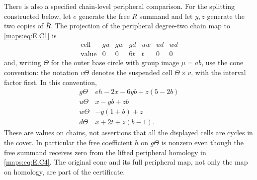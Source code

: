 \begin{theorem}
There is also a specified chain-level peripheral comparison.
For the splitting constructed below, let $e$ generate the
free $R$ summand and let $y,z$ generate the two copies of
$\overline R$. The projection of the peripheral degree-two
chain map to \eqref{maps:eq:E.C1} is
\[
 \begin{array}{c|rrrrrr}
 \text{cell}&gu&gw&gd&uw&ud&wd\\ \hline
 \text{value}&0&0&6t&t&0&0
 \end{array}
 \tag{E.C19a}\label{maps:eq:E.C19a}
\]
and, writing $\Theta$ for the outer base circle with
group image $\mu=ab$, use the cone convention: the
notation $v\Theta$ denotes the suspended cell
$\Theta\times v$, with the interval factor first.
In this convention,
\[
 \begin{array}{c|l}
  g\Theta&eh-2x-6yb+z(5-2b)\\
  u\Theta&x-yb+zb\\
  w\Theta&-y(1+b)+z\\
  d\Theta&x+2t+z(b-1).
 \end{array}
 \tag{E.C19b}\label{maps:eq:E.C19b}
\]
These are values on chains, not assertions that all
the displayed cells are cycles in the cover. In
particular the free coefficient $h$ on $g\Theta$
is nonzero even though the free summand receives
zero from the lifted peripheral homology in \eqref{maps:eq:E.C4}.
The original cone and its full peripheral map, not
only the map on homology, are part of the certificate.

\end{theorem}


